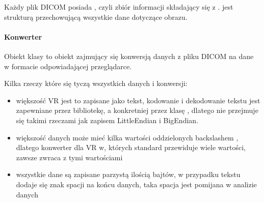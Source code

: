 
Każdy plik DICOM posiada , czyli zbiór informacji składający się z .
 jest strukturą przechowującą wszystkie dane dotyczące obrazu.

\paragraph{Konwerter}

Obiekt klasy  to obiekt zajmujący się konwersją danych z pliku DICOM na dane w formacie odpowiadającej przeglądarce.

Kilka rzeczy które się tyczą wszystkich danych i konwersji:
\begin{itemize}
    \item większość VR jest to zapisane jako tekst, kodowanie i dekodowanie tekstu jest zapewniane przez bibliotekę, a konkretniej przez klasę , dlatego nie przejmuje się takimi rzeczami jak zapisem LittleEndian i BigEndian.
    \item większość danych może mieć kilka wartości oddzielonych backslashem \quotett{\textbackslash}, dlatego konwerter dla VR w, których standard przewiduje wiele wartości, zawsze zwraca  z tymi wartościami
    \item wszystkie dane są zapisane parzystą ilością bajtów, w przypadku tekstu dodaje się znak spacji na końcu danych, taka spacja jest pomijana w analizie danych
\end{itemize}

